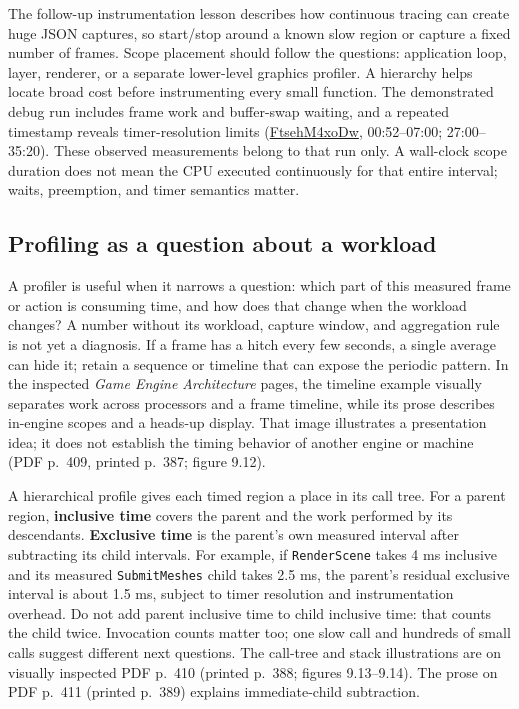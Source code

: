 The follow-up instrumentation lesson describes how continuous tracing can create huge JSON captures, so start/stop around a known slow region or capture a fixed number of frames. Scope placement should follow the questions: application loop, layer, renderer, or a separate lower-level graphics profiler. A hierarchy helps locate broad cost before instrumenting every small function. The demonstrated debug run includes frame work and buffer-swap waiting, and a repeated timestamp reveals timer-resolution limits (\href{https://www.youtube.com/watch?v=FtsehM4xoDw}{FtsehM4xoDw}, 00:52--07:00; 27:00--35:20). These observed measurements belong to that run only. A wall-clock scope duration does not mean the CPU executed continuously for that entire interval; waits, preemption, and timer semantics matter.

\subsection{Profiling as a question about a workload}\label{06-engine-ii-ch041-profiling-as-a-question-about-a-workload}

A profiler is useful when it narrows a question: which part of this measured frame or action is consuming time, and how does that change when the workload changes? A number without its workload, capture window, and aggregation rule is not yet a diagnosis. If a frame has a hitch every few seconds, a single average can hide it; retain a sequence or timeline that can expose the periodic pattern. In the inspected \emph{Game Engine Architecture} pages, the timeline example visually separates work across processors and a frame timeline, while its prose describes in-engine scopes and a heads-up display. That image illustrates a presentation idea; it does not establish the timing behavior of another engine or machine (PDF p.~409, printed p.~387; figure 9.12).

A hierarchical profile gives each timed region a place in its call tree. For a parent region, \textbf{inclusive time} covers the parent and the work performed by its descendants. \textbf{Exclusive time} is the parent's own measured interval after subtracting its child intervals. For example, if \texttt{RenderScene} takes 4 ms inclusive and its measured \texttt{SubmitMeshes} child takes 2.5 ms, the parent's residual exclusive interval is about 1.5 ms, subject to timer resolution and instrumentation overhead. Do not add parent inclusive time to child inclusive time: that counts the child twice. Invocation counts matter too; one slow call and hundreds of small calls suggest different next questions. The call-tree and stack illustrations are on visually inspected PDF p.~410 (printed p.~388; figures 9.13--9.14). The prose on PDF p.~411 (printed p.~389) explains immediate-child subtraction.

